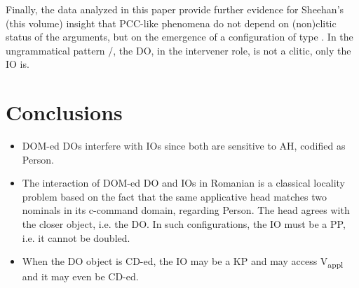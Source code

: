 \documentclass[output=paper,colorlinks,citecolor=brown,nonflat]{langsci/langscibook}
\begin{document}
Finally, the data analyzed in this paper provide further evidence for Sheehan’s (this volume) insight that PCC-like phenomena do not depend on (non)clitic status of the arguments, but on the emergence of a configuration of type . In the ungrammatical pattern /, the DO, in the intervener role, is not a clitic, only the IO is.

\section{Conclusions} %

\begin{itemize}
\item DOM-ed DOs interfere with IOs since both are sensitive to AH, codified as Person.
\item
The interaction of DOM-ed DO and IOs in Romanian is a classical locality problem based on the fact that the same applicative head matches two nominals in its c-command domain, regarding Person. The head agrees with the closer object, i.e. the DO. In such configurations, the IO must be a PP, i.e. it cannot be doubled.
\item
 When the DO object is CD-ed, the IO may be a KP and may access V\textsubscript{appl} and it may even be CD-ed.
\end{itemize}

\sloppy\printbibliography[heading=subbibliography,notkeyword=this]
\end{document}
